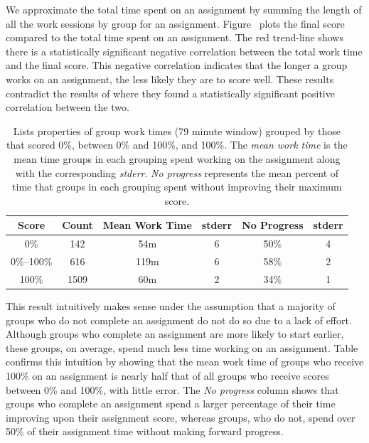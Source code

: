 We approximate the total time spent on an assignment by summing the length of
all the work sessions by group for an
assignment. Figure~ plots the final score compared to
the total time spent on an assignment. The red trend-line shows there is a
statistically significant negative correlation between the total work time and
the final score. This negative correlation indicates that the longer a group
works on an assignment, the less likely they are to score well. These results
contradict the results of \spacco{} where they found a statistically
significant positive correlation between the two.

\begin{table}
\centering
\begin{tabular}{|c||c|c|c|c|c|} \hline
Score & Count & Mean Work Time & stderr & No Progress & stderr \\ \hline \hline
0\% & 142 & 54m & 6 & 50\% & 4 \\ \hline
0\%--100\% & 616 & 119m & 6 & 58\% & 2 \\ \hline
100\% & 1509 & 60m & 2 & 34\% & 1 \\ \hline
\end{tabular}
\caption{Lists properties of group work times (79 minute window) grouped by
  those that scored 0\%, between 0\% and 100\%, and 100\%. The \emph{mean work
    time} is the mean time groups in each grouping spent working on the
  assignment along with the corresponding \emph{stderr}. \emph{No progress}
  represents the mean percent of time that groups in each grouping spent
  without improving their maximum score.}
\end{table}

This result intuitively makes sense under the assumption that a majority of
groups who do not complete an assignment do not do so due to a lack of
effort. Although groups who complete an assignment are more likely to start
earlier, these groups, on average, spend much less time working on an
assignment. Table~ confirms this intuition by showing
that the mean work time of groups who receive 100\% on an assignment is nearly
half that of all groups who receive scores between 0\% and 100\%, with little
error. The \emph{No progress} column shows that groups who complete an
assignment spend a larger percentage of their time improving upon their
assignment score, whereas groups, who do not, spend over 50\% of their
assignment time without making forward progress.

